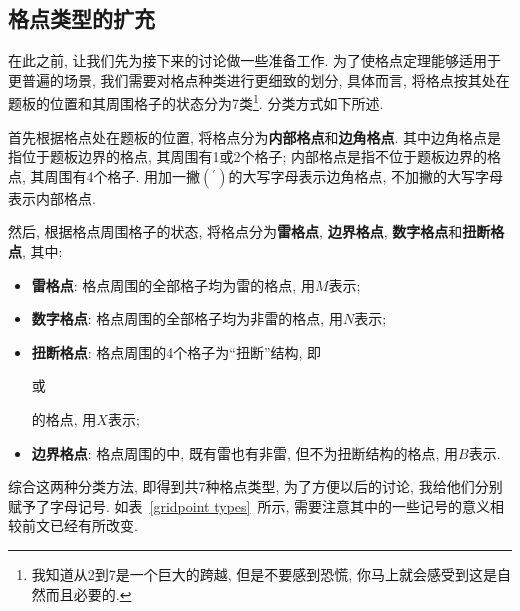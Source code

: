 \documentclass{ctexart}
\begin{document}
\subsection{格点类型的扩充}
在此之前, 让我们先为接下来的讨论做一些准备工作. 为了使格点定理能够适用于更普遍的场景, 我们需要对格点种类进行更细致的划分, 具体而言, 将格点按其处在题板的位置和其周围格子的状态分为7类\footnote{我知道从2到7是一个巨大的跨越, 但是不要感到恐慌, 你马上就会感受到这是自然而且必要的.}.
分类方式如下所述.

首先根据格点处在题板的位置, 将格点分为\textbf{内部格点}和\textbf{边角格点}. 其中边角格点是指位于题板边界的格点, 其周围有1或2个格子; 内部格点是指不位于题板边界的格点, 其周围有4个格子. 用加一撇$(^\prime)$的大写字母表示边角格点, 不加撇的大写字母表示内部格点.

然后, 根据格点周围格子的状态, 将格点分为\textbf{雷格点}, \textbf{边界格点}, \textbf{数字格点}和\textbf{扭断格点}, 其中:
\begin{itemize}
    \item \textbf{雷格点}: 格点周围的全部格子均为雷的格点, 用$M$表示;
    \item \textbf{数字格点}: 格点周围的全部格子均为非雷的格点, 用$N$表示;
    \item \textbf{扭断格点}: 格点周围的4个格子为``扭断''结构, 即
        或
        的格点, 用$X$表示;
    \item \textbf{边界格点}: 格点周围的中, 既有雷也有非雷, 但不为扭断结构的格点, 用$B$表示.
\end{itemize}
综合这两种分类方法, 即得到共7种格点类型, 为了方便以后的讨论, 我给他们分别赋予了字母记号. 如表\ \ref{gridpoint types}\ 所示, 需要注意其中的一些记号的意义相较前文已经有所改变.
\end{document}
